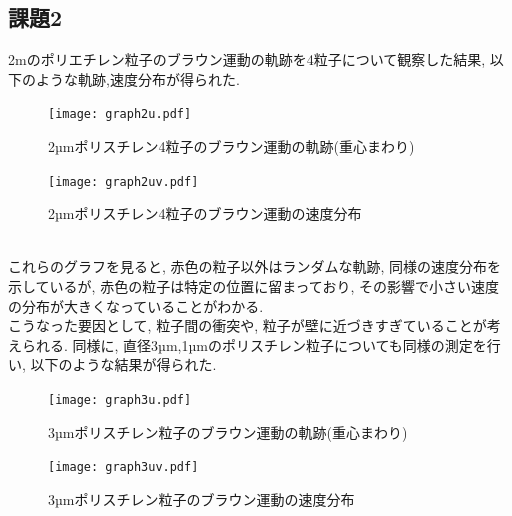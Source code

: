 \documentclass[11pt]{ltjsarticle}
\begin{document}
    \subsection*{課題2}
      2\mu mのポリエチレン粒子のブラウン運動の軌跡を4粒子について観察した結果, 以下のような軌跡,速度分布が得られた.\\
      \begin{minipage}{0.48\textwidth}
        \begin{figure}[H]
          \centering
          \texttt{[image: graph2u.pdf]}
          \caption{2µmポリスチレン4粒子のブラウン運動の軌跡(重心まわり)}
          \label{fig:2ps_track}
        \end{figure}
      \end{minipage}
      \hfill
      \begin{minipage}{0.48\textwidth}
        \begin{figure}[H]
          \centering
          \texttt{[image: graph2uv.pdf]}
          \caption{2µmポリスチレン4粒子のブラウン運動の速度分布}
          \label{fig:2ps_speed}
        \end{figure}
      \end{minipage}
      \\
      これらのグラフを見ると, 赤色の粒子以外はランダムな軌跡, 同様の速度分布を示しているが, 赤色の粒子は特定の位置に留まっており, その影響で小さい速度の分布が大きくなっていることがわかる.\\
      こうなった要因として, 粒子間の衝突や, 粒子が壁に近づきすぎていることが考えられる. 
      同様に, 直径3µm,1µmのポリスチレン粒子についても同様の測定を行い, 以下のような結果が得られた.\\
      \begin{minipage}{0.48\textwidth}
        \begin{figure}[H]
          \centering
          \texttt{[image: graph3u.pdf]}
          \caption{3µmポリスチレン粒子のブラウン運動の軌跡(重心まわり)}
          \label{fig:3ps_track}
        \end{figure}
      \end{minipage}
      \hfill
      \begin{minipage}{0.48\textwidth}
        \begin{figure}[H]
          \centering
          \texttt{[image: graph3uv.pdf]}
          \caption{3µmポリスチレン粒子のブラウン運動の速度分布}
          \label{fig:3ps_speed}
        \end{figure}
      \end{minipage}
      \\
\end{document}
